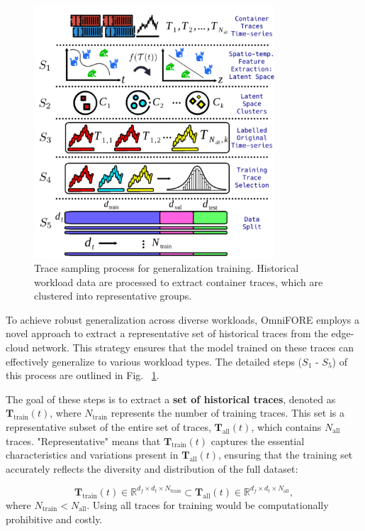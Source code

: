 \documentclass{ieeetmlcn}
\begin{document}
\begin{figure}\centering
\centering
\centering\includegraphics[width=0.8\textwidth]{img/proposed_solution_trace_selection.png}
\caption{Trace sampling process for generalization training. Historical workload data are processed to extract container traces, which are clustered into representative groups.}
\label{fig:proposed_solution_trace_selection}
\end{figure}

To achieve robust generalization across diverse workloads, OmniFORE employs a novel approach to extract a representative set of historical traces from the edge-cloud network. This strategy ensures that the model trained on these traces can effectively generalize to various workload types. The detailed steps ($S_1$ - $S_5$) of this process are outlined in Fig. ~\ref{fig:proposed_solution_trace_selection}.

The goal of these steps is to extract a \textbf{set of historical traces}, denoted as \(\mathbf{T}_{\text{train}}(t)\), where \(N_{\text{train}}\) represents the number of training traces. This set is a representative subset of the entire set of traces, \(\mathbf{T}_{\text{all}}(t)\), which contains \(N_{\text{all}}\) traces. "Representative" means that \(\mathbf{T}_{\text{train}}(t)\) captures the essential characteristics and variations present in \(\mathbf{T}_{\text{all}}(t)\), ensuring that the training set accurately reflects the diversity and distribution of the full dataset:

\begin{equation}
\mathbf{T}_{\text{train}}(t) \in \mathbb{R}^{d_f \times d_t \times N_{\text{train}}} \subset \mathbf{T}_{\text{all}}(t) \in \mathbb{R}^{d_f \times d_t \times N_{\text{all}}},
\end{equation}
where $N_{\text{train}} < N_{\text{all}}$. Using all traces for training would be computationally prohibitive and costly.
\end{document}
